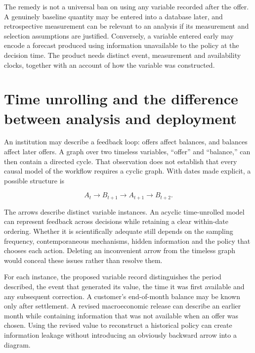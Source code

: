 The remedy is not a universal ban on using any variable recorded after
the offer. A genuinely baseline quantity may be entered into a database
later, and retrospective measurement can be relevant to an analysis if
its measurement and selection assumptions are justified. Conversely, a
variable entered early may encode a forecast produced using information
unavailable to the policy at the decision time. The product needs
distinct event, measurement and availability clocks, together with an
account of how the variable was constructed.

\hypertarget{time-unrolling-and-the-difference-between-analysis-and-deployment}{%
\section{Time unrolling and the difference between analysis and
deployment}\label{time-unrolling-and-the-difference-between-analysis-and-deployment}}

An institution may describe a feedback loop: offers affect balances, and
balances affect later offers. A graph over two timeless variables,
``offer'' and ``balance,'' can then contain a directed cycle. That
observation does not establish that every causal model of the workflow
requires a cyclic graph. With dates made explicit, a possible structure
is

\[
 A_t\longrightarrow B_{t+1}\longrightarrow A_{t+1}
 \longrightarrow B_{t+2}.
\]

The arrows describe distinct variable instances. An acyclic
time-unrolled model can represent feedback across decisions while
retaining a clear within-date ordering. Whether it is scientifically
adequate still depends on the sampling frequency, contemporaneous
mechanisms, hidden information and the policy that chooses each action.
Deleting an inconvenient arrow from the timeless graph would conceal
these issues rather than resolve them.

For each instance, the proposed variable record distinguishes the period
described, the event that generated its value, the time it was first
available and any subsequent correction. A customer's end-of-month
balance may be known only after settlement. A revised macroeconomic
release can describe an earlier month while containing information that
was not available when an offer was chosen. Using the revised value to
reconstruct a historical policy can create information leakage without
introducing an obviously backward arrow into a diagram.

